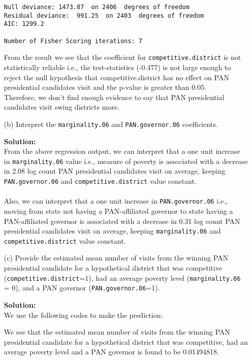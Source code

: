 \documentclass[12pt,letterpaper]{article}
\begin{document}
\begin{enumerate}
\begin{Verbatim}
Null deviance: 1473.87  on 2406  degrees of freedom
Residual deviance:  991.25  on 2403  degrees of freedom
AIC: 1299.2

Number of Fisher Scoring iterations: 7
\end{Verbatim}

From the result we see that the coefficient for \texttt{competitive.district} is not statistically reliable i.e., the test-statistics (-0.477) is not large enough to reject the null hypothesis that competitive.district has no effect on PAN presidential candidates visit and the p-value is greater than 0.05.\\
Therefore, we don't find enough evidence to say that PAN presidential candidates visit swing districts more.

	\item [(b)]
	Interpret the \texttt{marginality.06} and \texttt{PAN.governor.06} coefficients.

\vspace*{.2cm}
\noindent\textbf{Solution:\\}
From the above regression output, we can interpret that a one unit increase in \texttt{marginality.06} value i.e., measure of poverty is associated with a decrease in 2.08 log count PAN presidential candidates visit on average, keeping \texttt{PAN.governor.06} and \texttt{competitive.district} value constant.\\
\\Also, we can interpret that a one unit increase in \texttt{PAN.governor.06} i.e., moving from state not having a PAN-affiliated governor to state having a PAN-affiliated governor is associated with a decrease in 0.31 log count PAN presidential candidates visit on average, keeping \texttt{marginality.06} and \texttt{competitive.district} value constant.

	\item [(c)]
	Provide the estimated mean number of visits from the winning PAN presidential candidate for a hypothetical district that was competitive (\texttt{competitive.district}=1), had an average poverty level (\texttt{marginality.06} = 0), and a PAN governor (\texttt{PAN.governor.06}=1).

\vspace*{.2cm}
\noindent\textbf{Solution:\\}
We use the following codes to make the prediction:


We see that the estimated mean number of visits from the winning PAN presidential candidate for a hypothetical district that was competitive, had an average poverty level and a PAN governor is found to be 0.01494818.
\end{enumerate}
\end{document}

